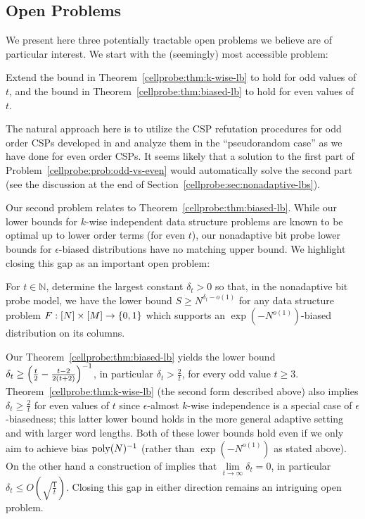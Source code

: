 \subsection{Open Problems}
We present here three potentially tractable open problems we believe are of particular interest.
We start with the (seemingly) most accessible problem:
\begin{problem}\label{cellprobe:prob:odd-vs-even}
Extend the bound in Theorem~\ref{cellprobe:thm:k-wise-lb} to hold for odd values of $t$, and the bound in Theorem~\ref{cellprobe:thm:biased-lb} to hold for even values of $t$.
\end{problem}
 The natural approach here is to utilize the CSP refutation procedures for odd order CSPs developed in \cite{semirandom,smoothed} and analyze them in the ``pseudorandom case'' as we have done for even order CSPs. It seems likely that a solution to the first part of Problem~\ref{cellprobe:prob:odd-vs-even} would automatically solve the second part (see the discussion at the end of Section~\ref{cellprobe:sec:nonadaptive-lbs}).

Our second problem relates to Theorem~\ref{cellprobe:thm:biased-lb}. While our lower bounds for $k$-wise independent data structure problems are known to be optimal up to lower order terms (for even $t$), our nonadaptive bit probe lower bounds for $\epsilon$-biased distributions have no matching upper bound. We highlight closing this gap as an important open problem:
\begin{problem}\label{cellprobe:prob:eps}
For $t \in \mathbb{N}$, determine the largest constant $\delta_t >0$ so that, in the nonadaptive bit probe model, we have the lower bound $S \geq N^{\delta_t-o(1)}$ for any data structure problem $F:[N] \times [M] \to \{0,1\}$ which supports an $\exp(-N^{o(1)})$-biased distribution on its columns.
\end{problem}
Our Theorem~\ref{cellprobe:thm:biased-lb} yields the lower bound $\delta_t\geq \Bigl( \frac{t}{2} - \frac{t-2}{2(t+2)}\Bigr)^{-1}$, in particular $\delta_t > \frac{2}{t}$, for every odd value $t \geq 3$. Theorem~\ref{cellprobe:thm:k-wise-lb} (the second form described above) also implies $\delta_t \geq \frac{2}{t}$ for even values of $t$ since $\epsilon$-almost $k$-wise independence is a special case of $\epsilon$-biasedness; this latter lower bound holds in the more general adaptive setting and with larger word lengths. Both of these lower bounds hold even if we only aim to achieve bias $\mathrm{poly}(N)^{-1}$ (rather than $\exp(-N^{o(1)})$ as stated above). On the other hand a construction of \cite{mossel-epsilon} implies that $\lim\limits_{t \to \infty} \delta_t = 0$, in particular $\delta_t \leq O(\sqrt{\frac{1}{t}} )$. Closing this gap in either direction remains an intriguing open problem.


